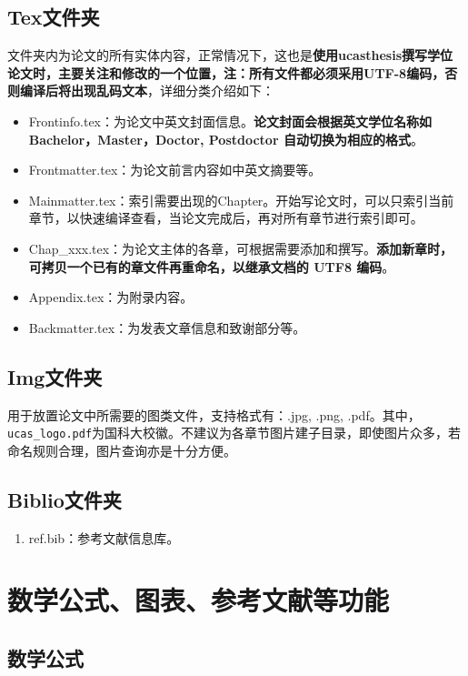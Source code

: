 \subsection{Tex文件夹}

文件夹内为论文的所有实体内容，正常情况下，这也是\textbf{使用ucasthesis撰写学位论文时，主要关注和修改的一个位置，注：所有文件都必须采用UTF-8编码，否则编译后将出现乱码文本}，详细分类介绍如下：

\begin{itemize}
    \item Frontinfo.tex：为论文中英文封面信息。\textbf{论文封面会根据英文学位名称如Bachelor，Master，Doctor, Postdoctor 自动切换为相应的格式}。
    \item Frontmatter.tex：为论文前言内容如中英文摘要等。
    \item Mainmatter.tex：索引需要出现的Chapter。开始写论文时，可以只索引当前章节，以快速编译查看，当论文完成后，再对所有章节进行索引即可。
    \item Chap{\_}xxx.tex：为论文主体的各章，可根据需要添加和撰写。\textbf{添加新章时，可拷贝一个已有的章文件再重命名，以继承文档的 UTF8 编码}。
    \item Appendix.tex：为附录内容。
    \item Backmatter.tex：为发表文章信息和致谢部分等。
\end{itemize}

\subsection{Img文件夹}

用于放置论文中所需要的图类文件，支持格式有：.jpg, .png, .pdf。其中，\verb|ucas_logo.pdf|为国科大校徽。不建议为各章节图片建子目录，即使图片众多，若命名规则合理，图片查询亦是十分方便。

\subsection{Biblio文件夹}

\begin{enumerate}
    \item ref.bib：参考文献信息库。
\end{enumerate}


\section{数学公式、图表、参考文献等功能}

\subsection{数学公式}


